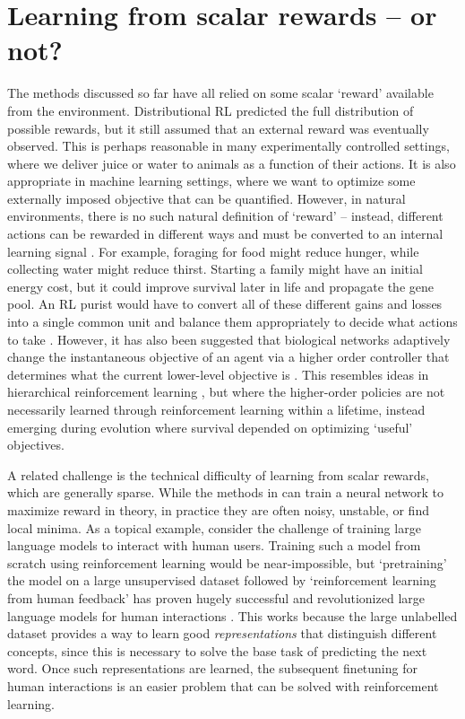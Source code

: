 
\section{Learning from scalar rewards -- or not?}
\label{sec:scalar_rew}

The methods discussed so far have all relied on some scalar `reward' available from the environment.
Distributional RL predicted the full distribution of possible rewards, but it still assumed that an external reward was eventually observed.
This is perhaps reasonable in many experimentally controlled settings, where we deliver juice or water to animals as a function of their actions.
It is also appropriate in machine learning settings, where we want to optimize some externally imposed objective that can be quantified.
However, in natural environments, there is no such natural definition of `reward' -- instead, different actions can be rewarded in different ways and must be converted to an internal learning signal \citep{juechems2019does}.
For example, foraging for food might reduce hunger, while collecting water might reduce thirst.
Starting a family might have an initial energy cost, but it could improve survival later in life and propagate the gene pool.
An RL purist would have to convert all of these different gains and losses into a single common unit and balance them appropriately to decide what actions to take \citep{silver2021reward}.
However, it has also been suggested that biological networks adaptively change the instantaneous objective of an agent via a higher order controller that determines what the current lower-level objective is \citep{juechems2019does,miller2001integrative}.
This resembles ideas in hierarchical reinforcement learning \citep{pateria2021hierarchical}, but where the higher-order policies are not necessarily learned through reinforcement learning within a lifetime, instead emerging during evolution where survival depended on optimizing `useful' objectives.

A related challenge is the technical difficulty of learning from scalar rewards, which are generally sparse.
While the methods in  can train a neural network to maximize reward in theory, in practice they are often noisy, unstable, or find local minima.
As a topical example, consider the challenge of training large language models to interact with human users.
Training such a model from scratch using reinforcement learning would be near-impossible, but `pretraining' the model on a large unsupervised dataset followed by `reinforcement learning from human feedback' has proven hugely successful and revolutionized large language models for human interactions \citep{team2023gemini}.
This works because the large unlabelled dataset provides a way to learn good \emph{representations} that distinguish different concepts, since this is necessary to solve the base task of predicting the next word.
Once such representations are learned, the subsequent finetuning for human interactions is an easier problem that can be solved with reinforcement learning.

